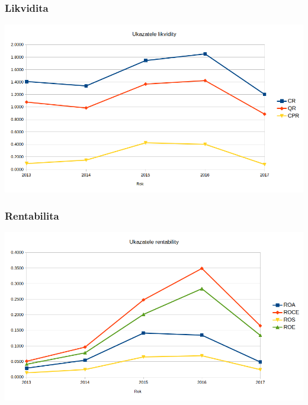 \documentclass[12pt]{article}%
\begin{document}
\subsubsection*{Likvidita}
\includegraphics[scale=0.6]{obr/ukazatele_likvidity.png}
\subsubsection*{Rentabilita}
\includegraphics[scale=0.6]{obr/ukazatele_rentability.png}
\end{document}
